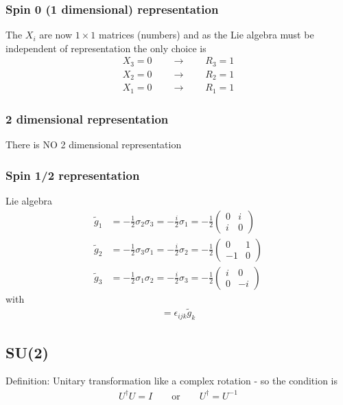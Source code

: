 \documentclass[../main.tex]{subfiles}
\begin{document}
\begin{itemize}
\subsubsection{Spin 0 (1 dimensional) representation}

The $X_i$ are now $1\times1$ matrices (numbers) and as the Lie algebra must be independent of representation the only choice is
\begin{align}
X_3=0\qquad\rightarrow\qquad R_3=1\\
X_2=0\qquad\rightarrow\qquad R_2=1\\
X_1=0\qquad\rightarrow\qquad R_1=1
\end{align}

\subsubsection{2 dimensional representation}
There is NO 2 dimensional representation

\subsubsection{Spin 1/2 representation}
Lie algebra
\begin{align}
\tilde{g}_1
&=-\frac{1}{2}\sigma_2\sigma_3
=-\frac{i}{2}\sigma_1
=-\frac{1}{2}\left(\begin{matrix}
0 & i\\
i & 0
\end{matrix}\right)\\
\tilde{g}_2
&=-\frac{1}{2}\sigma_3\sigma_1
=-\frac{i}{2}\sigma_2
=-\frac{1}{2}\left(\begin{matrix}
0 & 1\\
-1 & 0
\end{matrix}\right)\\
\tilde{g}_3
&=-\frac{1}{2}\sigma_1\sigma_2
=-\frac{i}{2}\sigma_3
=-\frac{1}{2}\left(\begin{matrix}
i & 0\\
0 & -i
\end{matrix}\right)
\end{align}
with
\begin{align}
[\tilde{g}_i,\tilde{g}_k]=\epsilon_{ijk}\tilde{g}_k
\end{align}

\subsection{SU(2)}
Definition: Unitary transformation like a complex rotation - so the condition is
\begin{align*}
U^\dagger U=I\qquad \text{or}\qquad U^\dagger=U^{-1}
\end{align*}


\end{itemize}
\end{document}
